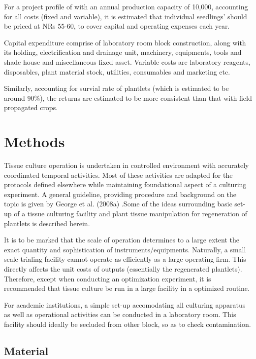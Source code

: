 \documentclass[
  man]{apa6}
\begin{document}
For a project profile of with an annual production capacity of 10,000, accounting for all costs (fixed and variable), it is estimated that individual seedlings' should be priced at NRs 55-60, to cover capital and operating expenses each year.

Capital expenditure comprise of laboratory room block construction, along with its holding, electrification and drainage unit, machinery, equipments, tools and shade house and miscellaneous fixed asset. Variable costs are laboratory reagents, disposables, plant material stock, utilities, consumables and marketing etc.

Similarly, accounting for survial rate of plantlets (which is estimated to be around 90\%), the returns are estimated to be more consistent than that with field propagated crops.

\hypertarget{methods}{%
\section{Methods}\label{methods}}

Tissue culture operation is undertaken in controlled environment with accurately coordinated temporal activities. Most of these activities are adapted for the protocols defined elsewhere while maintaining foundational aspect of a culturing experiment. A general guideline, providing procedure and background on the topic is given by George et al. (2008a) .Some of the ideas surrounding basic set-up of a tissue culturing facility and plant tissue manipulation for regeneration of plantlets is described herein.

It is to be marked that the scale of operation determines to a large extent the exact quantity and sophistication of instruments/equipments. Naturally, a small scale trialing facility cannot operate as efficiently as a large operating firm. This directly affects the unit costs of outputs (essentially the regenerated plantlets). Therefore, except when conducting an optimization experiment, it is recommended that tissue culture be run in a large facility in a optimized routine.

For academic institutions, a simple set-up accomodating all culturing apparatus as well as operational activities can be conducted in a laboratory room. This facility should ideally be secluded from other block, so as to check contamination.

\hypertarget{material}{%
\subsection{Material}\label{material}}
\end{document}
